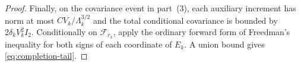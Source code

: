 \documentclass[10pt,a4paper]{amsart}
\begin{document}
\begin{proof}
Finally, on the covariance event in part~(3), each auxiliary increment has
norm at most $CV_k/\Lambda_k^{3/2}$ and the total conditional covariance is
bounded by $2\delta_kV_k^2I_2$. Conditionally on $\mathcal F_{r_k}$, apply the ordinary forward form of
Freedman's inequality for both signs of each coordinate of $E_k$. A union
bound gives \eqref{eq:completion-tail}.
\end{proof}
\end{document}
